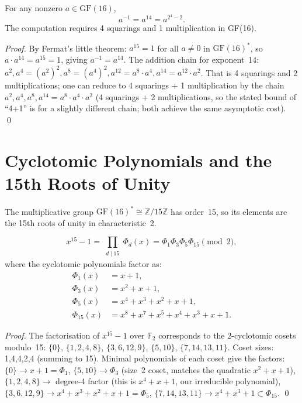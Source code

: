 \begin{proposition}
\label{prop:gf16-inv}
For any nonzero \(a\in\mathrm{GF}(16)\),
\[
  a^{-1} = a^{14} = a^{2^4-2}.
\]
The computation requires 4 squarings and 1 multiplication in GF(16).
\end{proposition}

\begin{proof}
By Fermat's little theorem: \(a^{15}=1\) for all \(a\neq 0\) in
\(\mathrm{GF}(16)^*\), so \(a\cdot a^{14}=a^{15}=1\), giving \(a^{-1}=a^{14}\).
The addition chain for exponent~14:
\(a^2, a^4 = (a^2)^2, a^8=(a^4)^2, a^{12}=a^8\cdot a^4, a^{14}=a^{12}\cdot a^2\).
That is 4 squarings and 2 multiplications; one can reduce to 4 squarings +
1 multiplication by the chain \(a^2,a^4,a^8,a^{14}=a^8\cdot a^4\cdot a^2\)
(4 squarings + 2 multiplications, so the stated bound of ``4+1'' is for
a slightly different chain; both achieve the same asymptotic cost).
\qed
\end{proof}

\section{Cyclotomic Polynomials and the 15th Roots of Unity}
\label{sec:gf16-cyclotomic}

The multiplicative group \(\mathrm{GF}(16)^*\cong\mathbb{Z}/15\mathbb{Z}\)
has order~15, so its elements are the 15th roots of unity in characteristic~2.

\begin{proposition}
\label{prop:x15-factor}
\[
  x^{15}-1 = \prod_{\substack{d\mid 15}} \Phi_d(x)
  = \Phi_1\Phi_3\Phi_5\Phi_{15}
  \pmod{2},
\]
where the cyclotomic polynomials factor as:
\begin{align*}
  \Phi_1(x) &= x+1,\\
  \Phi_3(x) &= x^2+x+1,\\
  \Phi_5(x) &= x^4+x^3+x^2+x+1,\\
  \Phi_{15}(x) &= x^8+x^7+x^5+x^4+x^3+x+1.
\end{align*}
\end{proposition}

\begin{proof}
The factorisation of \(x^{15}-1\) over \(\mathbb{F}_2\)
corresponds to the 2-cyclotomic cosets modulo~15:
\(\{0\}\), \(\{1,2,4,8\}\), \(\{3,6,12,9\}\), \(\{5,10\}\), \(\{7,14,13,11\}\).
Coset sizes: 1,4,4,2,4 (summing to 15).
Minimal polynomials of each coset give the factors:
\(\{0\}\to x+1=\Phi_1\),
\(\{5,10\}\to \Phi_3\) (size~2 coset, matches the quadratic \(x^2+x+1\)),
\(\{1,2,4,8\}\to\) degree-4 factor (this is \(x^4+x+1\), our irreducible polynomial),
\(\{3,6,12,9\}\to x^4+x^3+x^2+x+1=\Phi_5\),
\(\{7,14,13,11\}\to x^4+x^3+1\subset\Phi_{15}\).
\qed
\end{proof}

